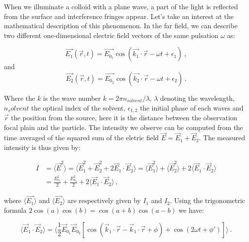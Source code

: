 When we illuminate a colloid with a plane wave, a part of the light is reflected from the surface and interference fringes appear. Let's take an interest at the mathematical description of this phenomenon. In the far field, we can describe two different one-dimensional electric field vectors of the same pulsation $\omega$ \cite{f_bohren_absorption_1998} as:

\begin{equation}
	\vec{E_1}(\vec{r}, t) = \vec{E_{0_1}} \cos(\vec{k_1} \cdot \vec{r} - \omega t + \epsilon_1) ~,
\end{equation}
and
\begin{equation}
	\vec{E_2}(\vec{r}, t) = \vec{E_{0_2}} \cos (\vec{k_2} \cdot \vec{r} - \omega t + \epsilon_2) ~.
\end{equation}



Where the $k$ is the wave number $k=2\pi n_{solvent}/\lambda$, $\lambda$ denoting the wavelength, $n_solvent$ the optical index of the solvent, $\epsilon_{1,2}$ the initial phase of each waves and $\vec{r}$ the position from the source, here it is the distance between the observation focal plain and the particle. The intensity we observe can be computed from the time averaged of the squared sum of the eletric field $\vec{E} = \vec{E}_1 + \vec{E}_2$. The measured intensity is thus given by:

\begin{equation}
	\begin{aligned}
		I & = \langle \vec{E}^2 \rangle = \langle \vec{E}_1^2 + \vec{E}_2^2 + 2\vec{E}_1 \cdot \vec{E}_2 \rangle 
		= \langle \vec{E}_1^2 \rangle + \langle \vec{E}_2^2 \rangle  + 2 \langle \vec{E}_1 \cdot \vec{E}_2 \rangle \\
		& = \frac{{E_{0_1}^2}}{2} + \frac{{E_{0_2}^2}}{2} +  2 \langle \vec{E}_1 \cdot \vec{E}_2 \rangle ~,
	\end{aligned}
\end{equation} 

where $ \langle \vec{E_1} \rangle $ and  $\langle \vec{E_2} \rangle$ are respectively given by $I_1$ and $I_2$. Using the trigonometric formula $2 \cos (a)\cos (b) = \cos (a+b) \cos (a-b) $ we have:

\begin{equation}
	\langle  
	\vec{E}_1 \cdot \vec{E}_2 \rangle = 
	\langle
	\frac{1}{2} \vec{E}_{0_1}  \vec{E}_{0_2} 
	\left[
		\cos 
		\left(
			\vec{k}_1 \cdot \vec{r} - \vec{k}_1 \cdot \vec{r} + \phi	
		\right)	
		+ 
		\cos
		\left(
			2\omega t + \phi'
		\right)
	\right]
	\rangle~.
\end{equation}

